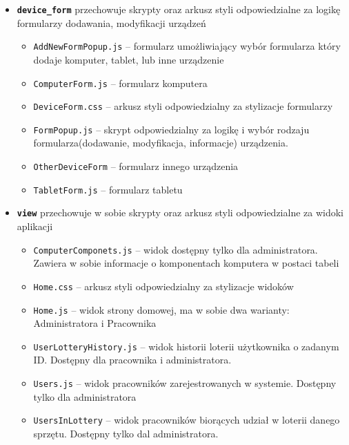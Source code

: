 \begin {itemize}
	\begin{itemize}
	\item \texttt{CpuForm.js} -- formularz procesora
	\item \texttt{RamForm.js} -- formularz pamięci RAM
	\item \texttt{StorageForm.js} -- formularz pamięcu dyskowej
	\end{itemize}
\item \texttt{\textbf{device\_form}} przechowuje skrypty oraz arkusz styli odpowiedzialne za logikę formularzy dodawania, modyfikacji urządzeń
	\begin{itemize}
	\item \texttt{AddNewFormPopup.js} -- formularz umożliwiający wybór formularza który dodaje komputer, tablet, lub inne urządzenie
	\item \texttt{ComputerForm.js} -- formularz komputera
	\item \texttt{DeviceForm.css} -- arkusz styli odpowiedzialny za stylizacje formularzy
	\item \texttt{FormPopup.js} -- skrypt odpowiedzialny za logikę i wybór rodzaju formularza(dodawanie, modyfikacja, informacje) urządzenia.
	\item \texttt{OtherDeviceForm} -- formularz innego urządzenia
	\item \texttt{TabletForm.js} -- formularz tabletu
	\end{itemize}
\item \texttt{\textbf{view}} przechowuje w sobie skrypty oraz arkusz styli odpowiedzialne za widoki aplikacji
	\begin{itemize}
	\item \texttt{ComputerComponets.js} -- widok dostępny tylko dla administratora. Zawiera w sobie informacje o komponentach komputera w postaci tabeli
	\item \texttt{Home.css} -- arkusz styli odpowiedzialny za stylizacje widoków
	\item \texttt{Home.js} -- widok strony domowej, ma w sobie dwa warianty: Administratora i Pracownika
	\item \texttt{UserLotteryHistory.js} -- widok historii loterii użytkownika o zadanym ID. Dostępny dla pracownika i administratora.
	\item \texttt{Users.js} -- widok pracowników zarejestrowanych w systemie. Dostępny tylko dla administratora
	\item \texttt{UsersInLottery} -- widok pracowników biorących udział w loterii danego sprzętu. Dostępny tylko dal administratora.
	\end{itemize}
\end{itemize}

